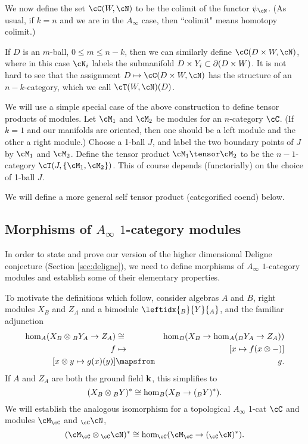 We now define the set $\cC(W, \cN)$ to be the colimit of the functor $\psi_\cN$.
(As usual, if $k=n$ and we are in the $A_\infty$ case, then ``colimit" means
homotopy colimit.)

If $D$ is an $m$-ball, $0\le m \le n-k$, then we can similarly define
$\cC(D\times W, \cN)$, where in this case $\cN_i$ labels the submanifold 
$D\times Y_i \subset \partial(D\times W)$.
It is not hard to see that the assignment $D \mapsto \cC(D\times W, \cN)$
has the structure of an $n{-}k$-category, which we call $\cT(W, \cN)(D)$.

\medskip


We will use a simple special case of the above 
construction to define tensor products 
of modules.
Let $\cM_1$ and $\cM_2$ be modules for an $n$-category $\cC$.
(If $k=1$ and our manifolds are oriented, then one should be 
a left module and the other a right module.)
Choose a 1-ball $J$, and label the two boundary points of $J$ by $\cM_1$ and $\cM_2$.
Define the tensor product $\cM_1 \tensor \cM_2$ to be the 
$n{-}1$-category $\cT(J, \{\cM_1, \cM_2\})$.
This of course depends (functorially)
on the choice of 1-ball $J$.

We will define a more general self tensor product (categorified coend) below.







\subsection{Morphisms of $A_\infty$ $1$-category modules}
\label{ss:module-morphisms}

In order to state and prove our version of the higher dimensional Deligne conjecture
(Section \ref{sec:deligne}),
we need to define morphisms of $A_\infty$ $1$-category modules and establish
some of their elementary properties.

To motivate the definitions which follow, consider algebras $A$ and $B$, 
right modules $X_B$ and $Z_A$ and a bimodule $\leftidx{_B}{Y}{_A}$, and the familiar adjunction
\begin{eqnarray*}
	\hom_A(X_B\ot {_BY_A} \to Z_A) &\cong& \hom_B(X_B \to \hom_A( {_BY_A} \to Z_A)) \\
	f &\mapsto& [x \mapsto f(x\ot -)] \\
	{}[x\ot y \mapsto g(x)(y)] & \mapsfrom & g .
\end{eqnarray*}
If $A$ and $Z_A$ are both the ground field ${\bf k}$, this simplifies to
\[
	(X_B\otimes {_BY})^* \cong  \hom_B(X_B \to (_BY)^*) .
\]
We will establish the analogous isomorphism for a topological $A_\infty$ 1-cat $\cC$
and modules $\cM_\cC$ and $_\cC\cN$,
\[
	(\cM_\cC\ot {_\cC\cN})^* \cong  \hom_\cC(\cM_\cC \to (_\cC\cN)^*) .
\]

